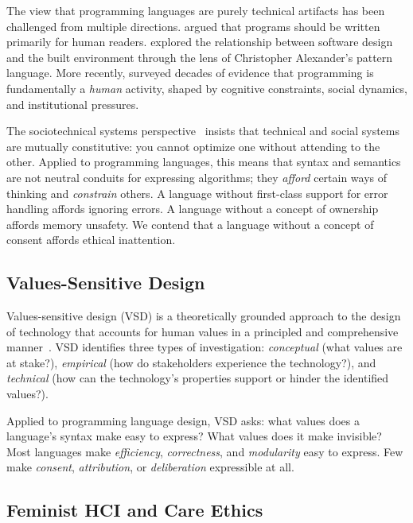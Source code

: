 \documentclass[11pt,a4paper]{article}
\begin{document}
The view that programming languages are purely technical artifacts has
been challenged from multiple directions.  \citet{knuth1984literate}
argued that programs should be written primarily for human readers.
\citet{gabriel1996patterns} explored the relationship between software
design and the built environment through the lens of Christopher
Alexander's pattern language.  More recently, \citet{ko2017past}
surveyed decades of evidence that programming is fundamentally a
\emph{human} activity, shaped by cognitive constraints, social
dynamics, and institutional pressures.

The sociotechnical systems perspective~\citep{trist1981evolution}
insists that technical and social systems are mutually constitutive:
you cannot optimize one without attending to the other.  Applied to
programming languages, this means that syntax and semantics are not
neutral conduits for expressing algorithms; they \emph{afford} certain
ways of thinking and \emph{constrain} others.  A language without
first-class support for error handling affords ignoring errors.  A
language without a concept of ownership affords memory unsafety.  We
contend that a language without a concept of consent affords ethical
inattention.

\subsection{Values-Sensitive Design}

Values-sensitive design (VSD) is a theoretically grounded approach to
the design of technology that accounts for human values in a
principled and comprehensive
manner~\citep{friedman1996value,friedman2013value}.  VSD identifies
three types of investigation: \emph{conceptual} (what values are at
stake?), \emph{empirical} (how do stakeholders experience the
technology?), and \emph{technical} (how can the technology's
properties support or hinder the identified values?).

Applied to programming language design, VSD asks: what values does a
language's syntax make easy to express?  What values does it make
invisible?  Most languages make \emph{efficiency}, \emph{correctness},
and \emph{modularity} easy to express.  Few make \emph{consent},
\emph{attribution}, or \emph{deliberation} expressible at all.

\subsection{Feminist HCI and Care Ethics}
\end{document}
